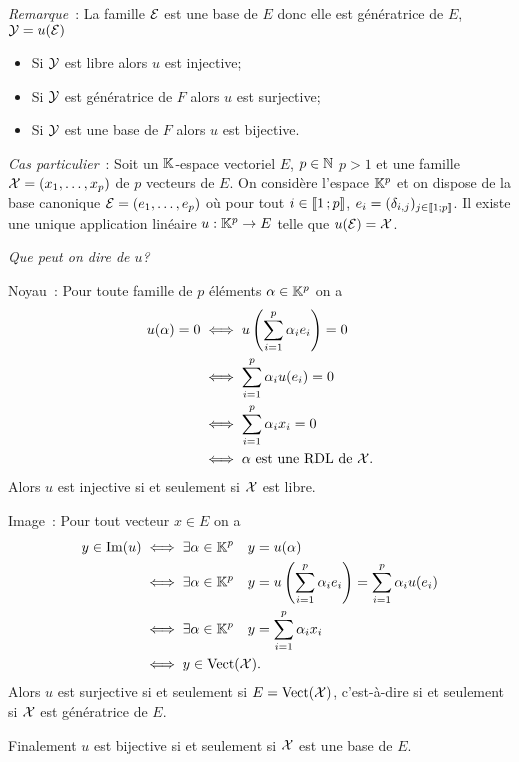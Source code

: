 \emph{Remarque}~: La famille \(\mathcal{E}\) est une base de \(E\) donc elle est génératrice de \(E\), \(\mathcal{Y}=u(\mathcal{E})\)
\begin{itemize}
  \item Si \(\mathcal{Y}\) est libre alors \(u\) est injective;
  \item Si \(\mathcal{Y}\) est génératrice de \(F\) alors \(u\) est surjective;
  \item Si \(\mathcal{Y}\) est une base de \(F\) alors \(u\) est bijective.
\end{itemize}

\emph{Cas particulier}~: Soit un \(\mathbb{K}\)-espace vectoriel \(E\), \(p \in \mathbb{N}\) \(p>1\) et une famille \(\mathcal{X}=(x_1, \ldots, x_p)\) de \(p\) vecteurs de \(E\). On considère l'espace \(\mathbb{K}^p\) et on dispose de la base canonique \(\mathcal{E}=(e_1, \ldots, e_p)\) où pour tout \(i \in \mathopen{\llbracket}1\mathclose{}\mathpunct{};p\mathclose{\rrbracket}\), \(e_i = (\delta_{i,j})_{j \in \mathopen{\llbracket}1\mathclose{}\mathpunct{};p\mathclose{\rrbracket}}\). Il existe une unique application linéaire \(u : \mathbb{K}^p \rightarrow E\) telle que \(u(\mathcal{E})=\mathcal{X}\).

\emph{Que peut on dire de \(u\)?}

Noyau~: Pour toute famille de \(p\) éléments \(\alpha \in \mathbb{K}^p\) on a
\begin{align}
  u(\alpha)=0 &\iff u\left(\sum_{i=1}^p \alpha_i e_i \right)=0\\
              &\iff \sum_{i=1}^p \alpha_i u(e_i) =0\\
              &\iff \sum_{i=1}^p \alpha_i x_i =0\\
              &\iff \alpha \text{~est une RDL de } \mathcal{X}.
\end{align}
Alors \(u\) est injective si et seulement si \(\mathcal{X}\) est libre.

Image~: Pour tout vecteur \(x \in E\) on a
\begin{align}
  y \in \operatorname{Im}(u) &\iff \exists \alpha \in \mathbb{K}^p \quad y=u(\alpha)\\
                  &\iff \exists \alpha \in \mathbb{K}^p \quad y=u\left(\sum_{i=1}^p \alpha_i e_i \right)= \sum_{i=1}^p \alpha_i u(e_i) \\
                  &\iff \exists \alpha \in \mathbb{K}^p \quad y=\sum_{i=1}^p \alpha_i x_i\\
                  &\iff y \in \operatorname{Vect}(\mathcal{X}).
\end{align}
Alors \(u\) est surjective si et seulement si \(E=\operatorname{Vect}(\mathcal{X})\), c'est-à-dire si et seulement si \(\mathcal{X}\) est génératrice de \(E\).

Finalement \(u\) est bijective si et seulement si \(\mathcal{X}\) est une base de \(E\).

